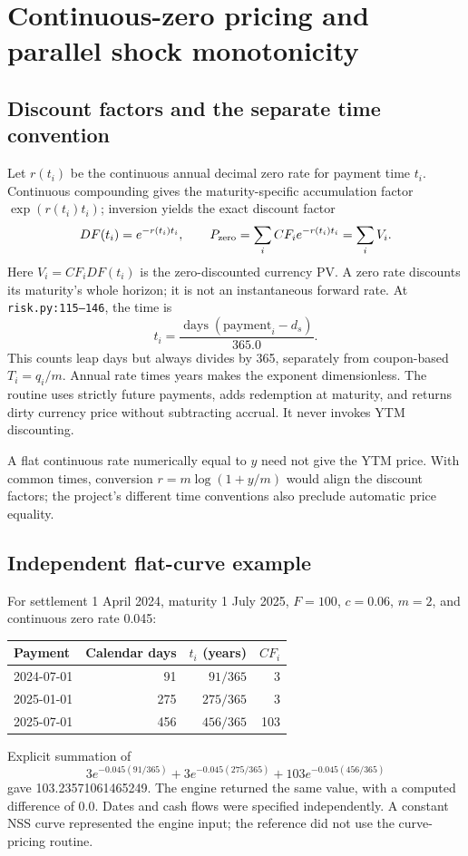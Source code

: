 \documentclass[12pt,a4paper]{article}
\begin{document}
\section{Continuous-zero pricing and parallel shock monotonicity}
\subsection{Discount factors and the separate time convention}
Let $r(t_i)$ be the continuous annual decimal zero rate for payment time
$t_i$. Continuous compounding gives the maturity-specific accumulation
factor $\exp(r(t_i)t_i)$; inversion yields the exact discount factor
\begin{equation}
 DF(t_i)=e^{-r(t_i)t_i},\qquad
 P_{\rm zero}=\sum_i CF_i e^{-r(t_i)t_i}=\sum_i V_i.
\end{equation}
Here $V_i=CF_iDF(t_i)$ is the zero-discounted currency PV. A zero rate
discounts its maturity's whole horizon; it is not an instantaneous forward rate.
At \texttt{risk.py:115--146}, the time is
\begin{equation}
 t_i=\frac{\operatorname{days}(\text{payment}_i-d_s)}{365.0}.
\end{equation}
This counts leap days but always divides by 365, separately from
coupon-based $T_i=q_i/m$. Annual rate times years makes the exponent
dimensionless. The routine uses strictly future payments, adds redemption
at maturity, and returns dirty currency price without subtracting accrual.
It never invokes YTM discounting.

A flat continuous rate numerically equal to $y$ need not give the YTM
price. With common times, conversion $r=m\log(1+y/m)$ would align the
discount factors; the project's different time conventions also preclude
automatic price equality.

\subsection{Independent flat-curve example}
For settlement 1 April 2024, maturity 1 July 2025, $F=100$, $c=0.06$,
$m=2$, and continuous zero rate 0.045:
\begin{center}\small
\begin{tabular}{@{}lrrr@{}}
\toprule
Payment & Calendar days & $t_i$ (years) & $CF_i$\\
\midrule
2024-07-01 & 91 & $91/365$ & 3\\
2025-01-01 & 275 & $275/365$ & 3\\
2025-07-01 & 456 & $456/365$ & 103\\
\bottomrule
\end{tabular}
\end{center}
Explicit summation of
\[
 3e^{-0.045(91/365)}+3e^{-0.045(275/365)}+103e^{-0.045(456/365)}
\]
gave 103.23571061465249. The engine returned the same value, with a
computed difference of 0.0. Dates and cash flows were specified independently.
A constant NSS curve represented the engine input; the reference did
not use the curve-pricing routine.
\end{document}
